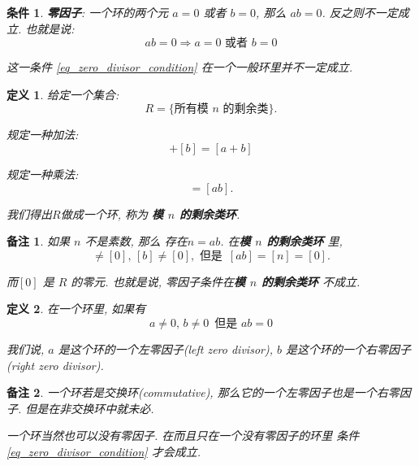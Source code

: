 \documentclass[utf8]{ctexbook}
\newtheorem{definition}{定义}[section]
\newtheorem{memo}{备注}[section]
\newtheorem{condition}{条件}[section]
\begin{document}
\begin{condition}
\textbf{零因子}: 一个环的两个元 $a = 0$ 或者 $b = 0$, 那么 $ab = 0$. 反之则不一定成立. 也就是说:
\begin{equation}
ab = 0 \Rightarrow a=0 \mbox{ 或者 } b=0 \label{eq_zero_divisor_condition}
\end{equation}

这一条件 \ref{eq_zero_divisor_condition} 在一个一般环里并不一定成立.
\end{condition}

\begin{definition}
给定一个集合:
\begin{equation}
R = \{ \mbox{所有模 $n$ 的剩余类} \}.
\end{equation}

规定一种加法:
\begin{equation}
[a] + [b] = [a+b]
\end{equation}

规定一种乘法:
\begin{equation}
[a][b] = [ab] .
\end{equation}

我们得出$R$做成一个环, 称为 \textbf{模 $n$ 的剩余类环}.

\end{definition}

\begin{memo}
如果 $n$ 不是素数, 那么 存在$n = ab$. 在\textbf{模 $n$ 的剩余类环} 里,
\begin{equation}
[a] \neq [0], \, [b] \neq [0], \mbox{ 但是 } \, [ab] = [n] = [0].
\end{equation}

而$[0]$ 是 $R$ 的零元. 也就是说, 零因子条件在\textbf{模 $n$ 的剩余类环} 不成立.


\end{memo}


\begin{definition}
在一个环里, 如果有
\begin{equation}
a \neq 0,\, b \neq 0 \, \mbox{  但是  }  ab = 0
\end{equation}

我们说, $a$ 是这个环的一个左零因子(left zero divisor), $b$ 是这个环的一个右零因子(right zero divisor).

\end{definition}


\begin{memo}
一个环若是交换环(commutative), 那么它的一个左零因子也是一个右零因子. 但是在非交换环中就未必.

一个环当然也可以没有零因子. 在而且只在一个没有零因子的环里 条件 \ref{eq_zero_divisor_condition} 才会成立. 
\end{memo}
\end{document}
